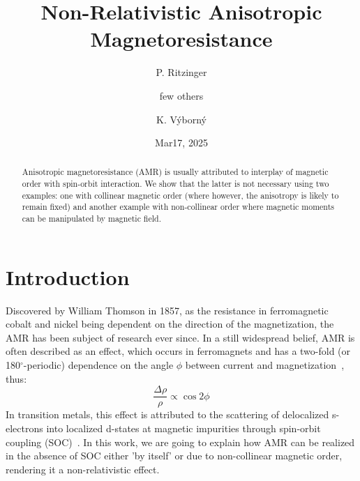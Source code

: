 \documentclass[prb,showpacs,amsmath,amssymb,superscriptaddress,twocolumn,floatfix]{revtex4-1}
\begin{document}
\title{Non-Relativistic Anisotropic Magnetoresistance}

\author{P. Ritzinger}

\author{few others}

\author{K. V\'yborn\'y}


\date{Mar17, 2025}

\begin{abstract}
Anisotropic magnetoresistance (AMR) is usually attributed to interplay
of magnetic order with spin-orbit interaction. We show that the latter
is not necessary using two examples: one with collinear magnetic order
(where however, the anisotropy is likely to remain fixed) and another
example with non-collinear order where magnetic moments can be
manipulated by magnetic field.
\end{abstract}


\maketitle

\section{Introduction}

Discovered by William Thomson in 1857,\cite{Thomson:1857} as the
resistance in ferromagnetic cobalt and nickel being dependent on the
direction of the magnetization, the AMR has been subject of research
ever since.\cite{Ritzinger:2023} In a still widespread belief, AMR is
often described as an effect, which occurs in ferromagnets and has a
two-fold (or 180$^\circ$-periodic) dependence on the angle $\phi$ between current and magnetization~\cite{Alagoz:2015}, thus:
%
\begin{equation}
	\frac{\Delta \rho}{\rho} \propto \cos 2 \phi
	\label{eq_ncollAMR}
\end{equation}
%
In transition metals, this
effect is attributed to the scattering of delocalized s-electrons into
localized d-states at magnetic impurities through spin-orbit coupling
(SOC)~\cite{McGuire:1975}. In this work, we are going to explain how
AMR can be realized in the absence of SOC either {\color{red}'by itself'} or due to non-collinear magnetic order, rendering it a non-relativistic effect.
\end{document}
